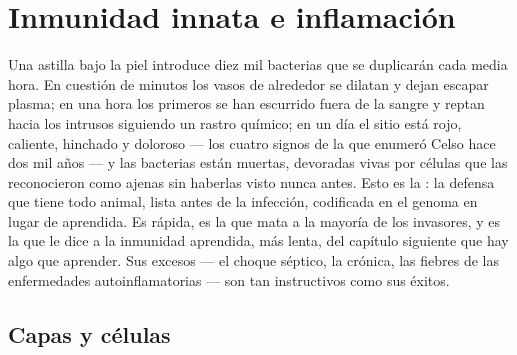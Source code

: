 \chapter{Inmunidad innata e inflamación}\label{ch:b3:innate-immunity}

Una astilla bajo la piel introduce diez mil bacterias que se duplicarán
cada media hora. En cuestión de minutos los vasos de alrededor se dilatan
y dejan escapar plasma; en una hora los primeros  se han
escurrido fuera de la sangre y reptan hacia los intrusos siguiendo un
rastro químico; en un día el sitio está rojo, caliente, hinchado y
doloroso --- los cuatro signos de la  que enumeró Celso hace
dos mil años --- y las bacterias están muertas, devoradas vivas por
células que las reconocieron como ajenas sin haberlas visto nunca antes.
Esto es la : la defensa que tiene todo animal, lista
antes de la infección, codificada en el genoma en lugar de aprendida. Es
rápida, es la que mata a la mayoría de los invasores, y es la que le dice
a la inmunidad aprendida, más lenta, del capítulo siguiente que hay algo
que aprender. Sus excesos --- el choque séptico, la  crónica,
las fiebres de las enfermedades autoinflamatorias --- son tan
instructivos como sus éxitos.

\section{Capas y células}

